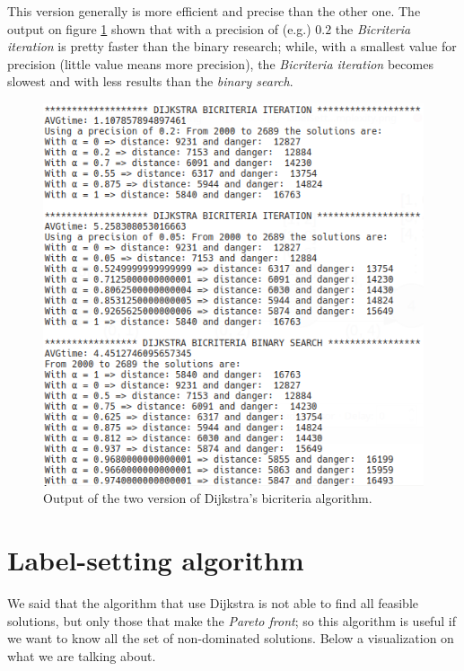 \documentclass[a4paper,11pt]{report}
\begin{document}
This version generally is more efficient and precise than the other one. The output on figure \ref{fig:dijkstraBiCriteriaSimple} shown that with a precision of (e.g.) $0.2$ the \textit{Bicriteria iteration} is pretty faster than the binary research; while, with a smallest value for precision (little value means more precision), the \textit{Bicriteria iteration} becomes slowest and with less results than the \textit{binary search}.

\begin{figure}[h]
	\centering
	\includegraphics[width=\linewidth]{img/biCriteriaOutput.png}
	\caption{Output of the two version of Dijkstra's bicriteria algorithm.}
	\label{fig:dijkstraBiCriteriaSimple}
\end{figure}

\section{Label-setting algorithm}
We said that the algorithm that use Dijkstra is not able to find all feasible solutions, but only those that make the \textit{Pareto front}; so this algorithm is useful if we want to know all the set of non-dominated solutions. Below a visualization on what we are talking about.
\end{document}
